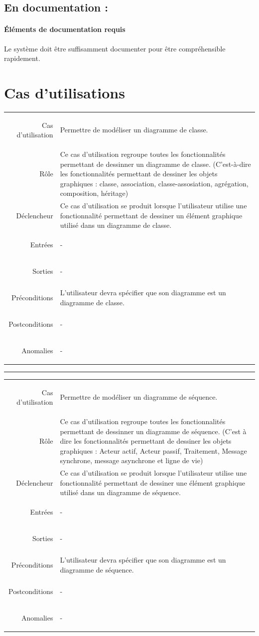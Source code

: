 \documentclass[12pt,a4paper,openany]{report}
\newcommand{\separateur}{\begin{center}\rule{12.6cm}{.5pt}\end{center}}
\begin{document}
		\subsection{En documentation :}
		\paragraph{Éléments de documentation requis} Le système doit être suffisamment documenter pour être compréhensible rapidement.
	\section{Cas d'utilisations}

	\begin{longtable}{>{\begin{bf}} r <{\end{bf}}!{:}p{13.5cm}}
	Cas d'utilisation & Permettre de modéliser un diagramme de classe.\\
	Rôle & Ce cas d'utilisation regroupe toutes les fonctionnalités permettant de dessinner un diagramme de classe.
	(C'est-à-dire les fonctionnalités permettant de dessiner les objets graphiques : classe, association, classe-assosiation,
	agrégation, composition, héritage) \\
	Déclencheur & Ce cas d'utilisation se produit lorsque l'utilisateur utilise une fonctionnalité permettant de dessiner un
	élément graphique utilisé dans un diagramme de classe.\\
	Entrées & -\\
	Sorties & -\\
	Préconditions & L'utilisateur devra spécifier que son diagramme est un diagramme de classe.\\
	Postconditions & -\\
	Anomalies & -\\
	\end{longtable}
		\separateur
	\begin{longtable}{>{\begin{bf}} r <{\end{bf}}!{:}p{13.5cm}}
	Cas d'utilisation & Permettre de modéliser un diagramme de séquence.\\
	Rôle & Ce cas d'utilisation regroupe toutes les fonctionnalités permettant de dessinner un diagramme de séquence.
	(C'est à dire les fonctionnalités permettant de dessiner les objets graphiques : Acteur actif, Acteur passif, Traitement,
	Message synchrone, message asynchrone et ligne de vie)\\
	Déclencheur & Ce cas d'utilisation se produit lorsque l'utilisateur utilise une fonctionnalité permettant de dessiner une élément
	graphique utilisé dans un diagramme de séquence.\\
	Entrées & -\\
	Sorties & -\\
	Préconditions & L'utilisateur devra spécifier que son diagramme est un diagramme de séquence. \\
	Postconditions & -\\
	Anomalies & -\\
	\end{longtable}
\end{document}

